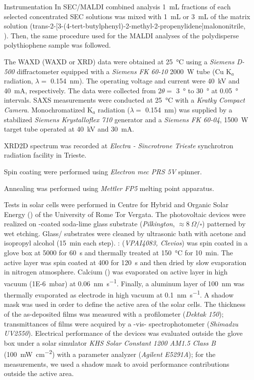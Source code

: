 \begin{section}{Instrumentation}
In \gls{SEC}\-/\gls{MALDI} combined analysis \SI{1}{\mL} fractions of each selected concentrated \gls{SEC} solutions was mixed with \SI{1}{\mL} or \SI{3}{\mL} of the matrix solution (trans-2-[3-(4-tert-butyl\-phenyl)-2-methyl-2-propenylidene]\-malononitrile, ). Then, the same procedure used for the \gls{MALDI} analyses of the poly\-disperse polythiophene sample was followed. 

The \acrlong{WAXD} (\gls{WAXD} or \gls{XRD}) data were obtained at \SI{25}{\celsius} using a \emph{Siemens D-500} diffracto\-meter equipped with a \emph{Siemens FK 60-10} \SI{2000}{\W} tube (Cu K$_a$ radiation, $\lambda =$ \SI{0.154}{\nm}). 
The operating voltage and current were \SI{40}{\kV} and \SI{40}{\mA}, respectively. The data were collected from $2\theta =$ \SI{3}{\degree} to \SI{30}{\degree} at \SI{0.05}{\degree} intervals. 
\Acrfull{SAXS} measurements were conducted at \SI{25}{\celsius} with a \emph{Kratky Compact Camera}. Mono\-chromatized  K$_a$ radiation 
($\lambda =$ \SI{0.154}{\nm}) was supplied by a stabilized \emph{Siemens Krystalloflex 710} generator and a \emph{Siemens FK 60-04}, \SI{1500}{\W}  target tube operated at \SI{40}{\kV} and \SI{30}{\mA}.

\Acrfull{XRD2D} spectrum was recorded at \emph{Electra - Sincrotrone Trieste} synchrotron radiation facility in Trieste.

Spin coating were performed using \emph{Electron mec PRS 5V} spinner.

Annealing was performed using \emph{Mettler FP5} melting point apparatus.

Tests in solar cells were performed in Centre for Hybrid and Organic Solar Energy () of the University of Rome Tor Vergata. The photo\-voltaic devices were realized on -coated soda-lime glass substrate (\emph{Pilkington}, $\approx8~\Omega/\square$) patterned by wet etching. Glass/ substrates were cleaned by ultrasonic bath with acetone and isopropyl alcohol (\SI{15}{\minute} each step). : (\emph{VPAI4083, Clevios}) was spin coated in a glove box at \SI{5000}{\rpm} for \SI{60}{\s} and thermally treated at \SI{150}{\celsius} for \SI{10}{\minute}. 
The active layer was spin coated at \SI{400}{\rpm} for \SI{120}{\s} and then dried by slow evaporation in nitrogen atmosphere. Calcium () was evaporated on active layer in high vacuum (\SI{1E-6}{\milli\bar}) at \SI{0.06}{\nm\per\s}. Finally, a aluminum layer of \SI{100}{\nm} was thermally evaporated as electrode in high vacuum at \SI{0.1}{\nm\per\s}. A shadow mask was used in order to define the active area of the solar cells. 
The thickness of the as-deposited films was measured with a profilometer (\emph{Dektak 150}); transmittances of films were acquired by a -vis- spectrophotometer (\emph{Shimadzu UV2550}). 
Electrical performance of the devices was evaluated outside the glove box under a solar simulator \emph{KHS Solar Constant 1200 AM1.5 Class B} (\SI{100}{\mW\per\square\cm}) with a parameter analyzer (\emph{Agilent E5291A}); for the measurements, we used a shadow mask to avoid performance contributions outside the active area. 


\end{section}
